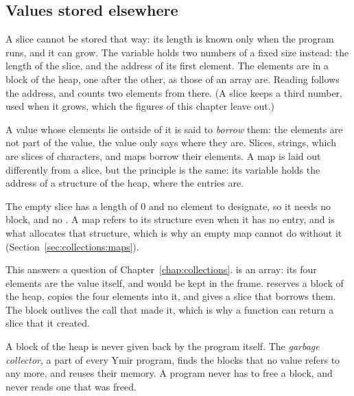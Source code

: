 \subsection{Values stored elsewhere}

A slice cannot be stored that way: its length is known only when the program
runs, and it can grow. The variable  holds two numbers of a fixed
size instead: the length of the slice, and the address of its first element.
The elements are in a block of the heap, one after the other, as those of an
array are. Reading  follows the address, and counts two
elements from there. (A slice keeps a third number, used when it grows, which
the figures of this chapter leave out.)

A value whose elements lie outside of it is said to \textit{borrow} them: the
elements are not part of the value, the value only says where they are. Slices,
strings, which are slices of characters, and maps borrow their elements. A map
is laid out differently from a slice, but the principle is the same: its
variable holds the address of a structure of the heap, where the entries are.

The empty slice \token{[]} has a length of 0 and no element to designate, so it
needs no block, and no . A map refers to its structure even when it
has no entry, and  is what allocates that structure, which is
why an empty map cannot do without it (Section~\ref{sec:collections:maps}).

This answers a question of Chapter~\ref{chap:collections}. \token{[2, 3, 5, 7]}
is an array: its four elements are the value itself, and would be kept in the
frame.  reserves a block of the heap, copies the four elements into
it, and gives a slice that borrows them. The block outlives the call that made
it, which is why a function can return a slice that it created.

A block of the heap is never given back by the program itself. The
\textit{garbage collector}, a part of every Ymir program, finds the blocks that
no value refers to any more, and reuses their memory. A program never has to
free a block, and never reads one that was freed.

